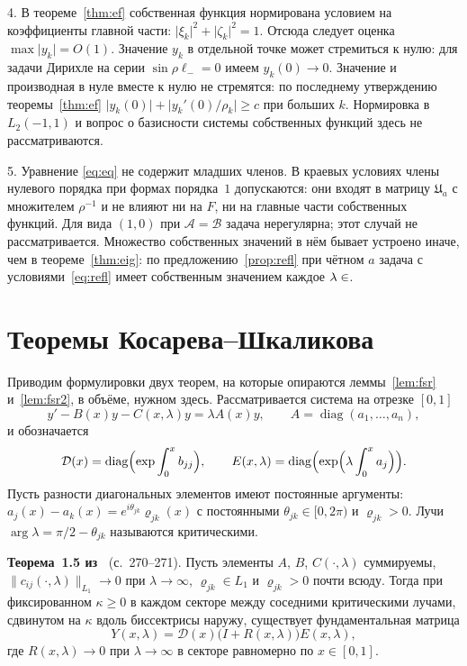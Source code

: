 \documentclass[12pt,a4paper]{article}
\numberwithin{equation}{section}
\theoremstyle{definition}
\let\C\relax\newcommand{\C}{\mathbb C}
\newcommand{\norm}[1]{\lVert#1\rVert}
\newcommand{\abs}[1]{\lvert#1\rvert}
\newcommand{\Uf}{\mathfrak U}
\begin{document}
4. В теореме~\ref{thm:ef} собственная функция нормирована условием на коэффициенты главной части:
$\abs{\xi_k}^2+\abs{\zeta_k}^2=1$. Отсюда следует оценка $\max\abs{y_k}=O(1)$. Значение $y_k$ в
отдельной точке может стремиться к нулю: для задачи Дирихле на серии $\sin\rho\ell_-=0$ имеем
$y_k(0)\to0$. Значение и производная в нуле вместе к нулю не стремятся: по последнему утверждению
теоремы~\ref{thm:ef} $\abs{y_k(0)}+\abs{y_k'(0)/\rho_k}\ge c$ при больших $k$. Нормировка в
$L_2(-1,1)$ и вопрос о базисности системы собственных функций здесь не рассматриваются.


5. Уравнение \eqref{eq:eq} не содержит младших членов. В краевых условиях члены нулевого
порядка при формах порядка~$1$ допускаются: они входят в матрицу $\Uf_a$ с множителем
$\rho^{-1}$ и не влияют ни на $F$, ни на главные части собственных функций. Для вида $(1,0)$ при
$\mathcal A=\mathcal B$ задача нерегулярна; этот случай не рассматривается. Множество собственных
значений в нём бывает устроено иначе, чем в теореме~\ref{thm:eig}: по предложению~\ref{prop:refl}
при чётном $a$ задача
с условиями~\eqref{eq:refl} имеет собственным значением каждое $\lambda\in\C$.

\appendix

\section{Теоремы Косарева--Шкаликова}\label{app:KS}

Приводим формулировки двух теорем, на которые опираются леммы~\ref{lem:fsr} и~\ref{lem:fsr2},
в объёме, нужном здесь. Рассматривается система на отрезке $[0,1]$
\[
 y'-B(x)y-C(x,\lambda)y=\lambda A(x)y,\qquad A=\operatorname{diag}(a_1,\dots,a_n),
\]
и обозначается
\[
 \mathcal D(x)=\operatorname{diag}\Bigl(\exp\int_0^xb_{jj}\Bigr),\qquad
 E(x,\lambda)=\operatorname{diag}\Bigl(\exp\Bigl(\lambda\int_0^xa_j\Bigr)\Bigr).
\]
Пусть разности диагональных элементов имеют постоянные аргументы:
$a_j(x)-a_k(x)=e^{i\theta_{jk}}\varrho_{jk}(x)$ с постоянными $\theta_{jk}\in[0,2\pi)$ и
$\varrho_{jk}>0$. Лучи $\arg\lambda=\pi/2-\theta_{jk}$ называются критическими.

\smallskip\noindent\textbf{Теорема~1.5 из~\cite{KS1}} (с.~270--271). Пусть элементы $A$, $B$,
$C(\cdot,\lambda)$ суммируемы, $\norm{c_{ij}(\cdot,\lambda)}_{L_1}\to0$ при $\lambda\to\infty$,
$\varrho_{jk}\in L_1$ и $\varrho_{jk}>0$ почти всюду. Тогда при фиксированном $\kappa\ge0$ в каждом
секторе между соседними критическими лучами, сдвинутом на $\kappa$ вдоль биссектрисы наружу,
существует фундаментальная матрица
\[
 Y(x,\lambda)=\mathcal D(x)\bigl(I+R(x,\lambda)\bigr)E(x,\lambda),
\]
где $R(x,\lambda)\to0$ при $\lambda\to\infty$ в секторе равномерно по $x\in[0,1]$.
\end{document}
